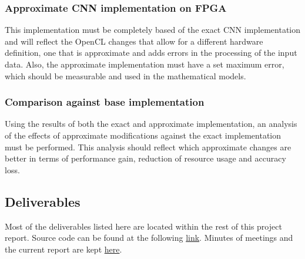 \subsubsection{Approximate CNN implementation on FPGA}

This implementation must be completely based of the exact CNN implementation and will 
reflect the OpenCL changes that allow for a different hardware definition, one that is 
approximate and adds errors in the processing of the input data. Also, the approximate
implementation must have a set maximum error, which should be measurable and used
in the mathematical models.

\subsubsection{Comparison against base implementation}

Using the results of both the exact and approximate implementation, an analysis of
the effects of approximate modifications against the exact implementation must be performed.
This analysis should reflect which approximate changes are better in terms of performance gain,
reduction of resource usage and accuracy loss.

\subsection{Deliverables}

Most of the deliverables listed here are located within the rest of this project report.
Source code can be found at the following \href{http://gitlab.com/jocastro/ax-opencl-cnn}{link}.
Minutes of meetings and the current
report are kept \href{https://www.dropbox.com/sh/ktc9c5mxm9t5343/AACNXCrKvYtFekfPbVpaepcXa?dl=0}{here}.

